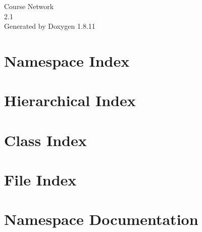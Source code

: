 \documentclass[twoside]{book}
\newcommand{\+}{\discretionary{\mbox{\scriptsize$\hookleftarrow$}}{}{}}
\newcommand{\clearemptydoublepage}{%
  \newpage{\pagestyle{empty}\cleardoublepage}%
}
\begin{document}
\hypersetup{pageanchor=false,
             bookmarksnumbered=true,
             pdfencoding=unicode
            }
\begin{titlepage}
\vspace*{7cm}
\begin{center}%
{\Large Course Network \\[1ex]\large 2.\+1 }\\
\vspace*{1cm}
{\large Generated by Doxygen 1.8.11}\\
\end{center}
\end{titlepage}
\clearemptydoublepage
\tableofcontents
\clearemptydoublepage
{}
\hypersetup{pageanchor=true}

\chapter{Namespace Index}

\chapter{Hierarchical Index}

\chapter{Class Index}

\chapter{File Index}

\chapter{Namespace Documentation}

















\end{document}
